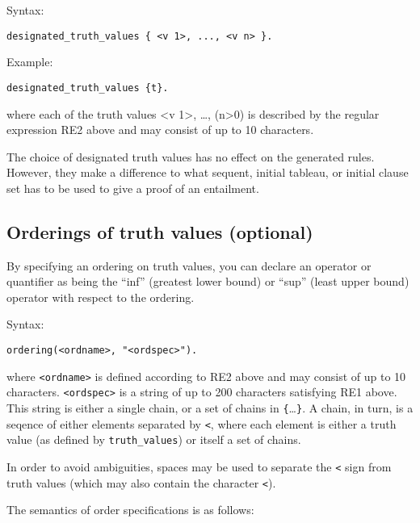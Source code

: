\documentclass[]{article}
\begin{document}
Syntax:

\begin{verbatim}
designated_truth_values { <v 1>, ..., <v n> }.
\end{verbatim}

Example:

\begin{verbatim}
designated_truth_values {t}.
\end{verbatim}

where each of the truth values \textless{}v 1\textgreater{}, \ldots{},
(n\textgreater{}0) is described by the regular expression RE2 above and
may consist of up to 10 characters.

The choice of designated truth values has no effect on the generated
rules. However, they make a difference to what sequent, initial tableau,
or initial clause set has to be used to give a proof of an entailment.

\hypertarget{orderings-of-truth-values-optional}{%
\subsection{Orderings of truth values
(optional)}\label{orderings-of-truth-values-optional}}

By specifying an ordering on truth values, you can declare an operator
or quantifier as being the ``inf'' (greatest lower bound) or ``sup''
(least upper bound) operator with respect to the ordering.

Syntax:

\begin{verbatim}
ordering(<ordname>, "<ordspec>").
\end{verbatim}

where \texttt{\textless{}ordname\textgreater{}} is defined according to
RE2 above and may consist of up to 10 characters.
\texttt{\textless{}ordspec\textgreater{}} is a string of up to 200
characters satisfying RE1 above. This string is either a single chain,
or a set of chains in \texttt{\{}\ldots{}\texttt{\}}. A chain, in turn,
is a seqence of either elements separated by \texttt{\textless{}}, where
each element is either a truth value (as defined by
\texttt{truth\_values}) or itself a set of chains.

In order to avoid ambiguities, spaces may be used to separate the
\texttt{\textless{}} sign from truth values (which may also contain the
character \texttt{\textless{}}).

The semantics of order specifications is as follows:
\end{document}
